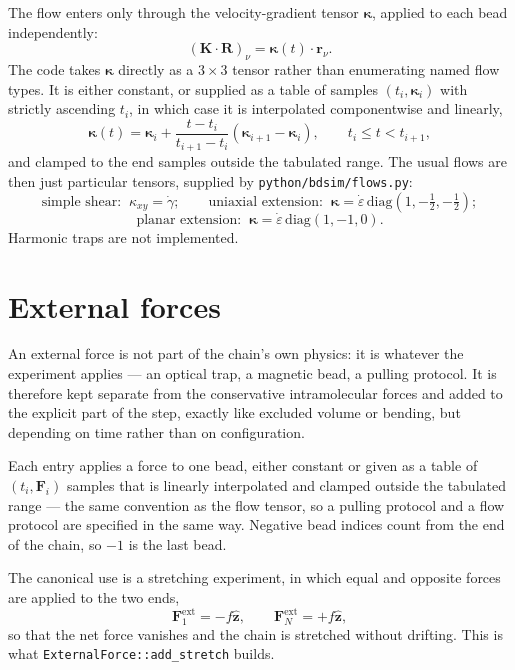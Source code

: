 \documentclass[11pt,a4paper]{report}
\newcommand{\R}{\bm{R}}
\newcommand{\code}[1]{\texttt{\seqsplitcode{#1}}}
\newcommand{\seqsplitcode}[1]{#1}
\begin{document}
The flow enters only through the velocity-gradient tensor $\bm{\kappa}$, applied
to each bead independently:
\begin{equation}
  (\bm{K}\cdot\R)_\nu = \bm{\kappa}(t)\cdot\bm{r}_\nu .
\end{equation}
The code takes $\bm{\kappa}$ directly as a $3\times3$ tensor rather than
enumerating named flow types. It is either constant, or supplied as a table of
samples $(t_i, \bm{\kappa}_i)$ with strictly ascending $t_i$, in which case it is
interpolated componentwise and linearly,
\begin{equation}
  \bm{\kappa}(t) = \bm{\kappa}_i
    + \frac{t-t_i}{t_{i+1}-t_i}\left(\bm{\kappa}_{i+1}-\bm{\kappa}_i\right),
    \qquad t_i \le t < t_{i+1},
\end{equation}
and clamped to the end samples outside the tabulated range. The usual flows are
then just particular tensors, supplied by \code{python/bdsim/flows.py}:
\begin{equation}
  \text{simple shear:}\;\; \kappa_{xy} = \dot\gamma;
  \qquad
  \text{uniaxial extension:}\;\; \bm{\kappa} = \dot\varepsilon\,\mathrm{diag}(1,-\tfrac12,-\tfrac12);
\end{equation}
\begin{equation}
  \text{planar extension:}\;\; \bm{\kappa} = \dot\varepsilon\,\mathrm{diag}(1,-1,0).
\end{equation}
Harmonic traps are not implemented.


\section{External forces}
\label{sec:external}

An external force is not part of the chain's own physics: it is whatever the
experiment applies --- an optical trap, a magnetic bead, a pulling protocol. It is
therefore kept separate from the conservative intramolecular forces and added to
the explicit part of the step, exactly like excluded volume or bending, but
depending on time rather than on configuration.

Each entry applies a force to one bead, either constant or given as a table of
$(t_i, \bm{F}_i)$ samples that is linearly interpolated and clamped outside the
tabulated range --- the same convention as the flow tensor, so a pulling protocol
and a flow protocol are specified in the same way. Negative bead indices count
from the end of the chain, so $-1$ is the last bead.

The canonical use is a stretching experiment, in which equal and opposite forces
are applied to the two ends,
\begin{equation}
  \bm{F}^{\mathrm{ext}}_{1} = -f\hat{\bm{z}},
  \qquad
  \bm{F}^{\mathrm{ext}}_{N} = +f\hat{\bm{z}},
  \label{eq:stretch}
\end{equation}
so that the net force vanishes and the chain is stretched without drifting. This
is what \code{ExternalForce::add\_stretch} builds.
\end{document}
